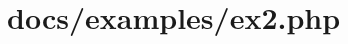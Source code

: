 \hypertarget{docs_2examples_2ex2_8php-example}{
\section{docs/examples/ex2.php}
}

\begin{DoxyCodeInclude}
\end{DoxyCodeInclude}
 